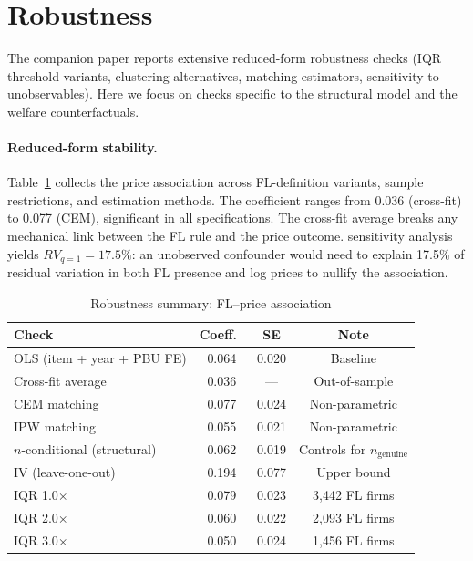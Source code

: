 
\section{Robustness}
\label{sec:robustness}

The companion paper \citep{genicolomartins2026screening} reports
extensive reduced-form robustness checks (IQR threshold variants,
clustering alternatives, matching estimators, sensitivity to
unobservables). Here we focus on checks specific to the structural
model and the welfare counterfactuals.

\paragraph{Reduced-form stability.}
Table~\ref{tab:robustness_summary} collects the price association
across FL-definition variants, sample restrictions, and estimation
methods. The coefficient ranges from 0.036 (cross-fit) to 0.077
(CEM), significant in all specifications. The cross-fit average
breaks any mechanical link between the FL rule and the price outcome.
\citet{cinelli2020making} sensitivity analysis yields $RV_{q=1} =
17.5\%$: an unobserved confounder would need to explain 17.5\% of
residual variation in both FL presence and log prices to nullify the
association.

\begin{table}[htbp]
\centering
\caption{Robustness summary: FL--price association}
\label{tab:robustness_summary}
\small
\begin{tabular}{lccc}
\hline\hline
Check & Coeff.\ & SE & Note \\
\hline
OLS (item + year + PBU FE) & 0.064 & 0.020 & Baseline \\
Cross-fit average & 0.036 & --- & Out-of-sample \\
CEM matching & 0.077 & 0.024 & Non-parametric \\
IPW matching & 0.055 & 0.021 & Non-parametric \\
$n$-conditional (structural) & 0.062 & 0.019 & Controls for $n_{\text{genuine}}$ \\
IV (leave-one-out) & 0.194 & 0.077 & Upper bound \\
\hline
IQR 1.0$\times$ & 0.079 & 0.023 & 3,442 FL firms \\
IQR 2.0$\times$ & 0.060 & 0.022 & 2,093 FL firms \\
IQR 3.0$\times$ & 0.050 & 0.024 & 1,456 FL firms \\
\hline\hline
\end{tabular}
\end{table}


